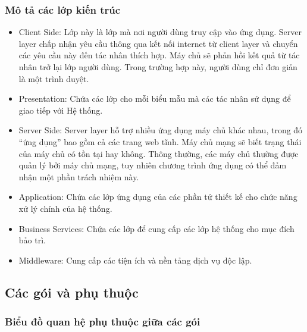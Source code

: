 \documentclass[./../main_file.tex]{subfiles}
\begin{document}
\subsubsection{Mô tả các lớp kiến trúc}

\begin{itemize}
	\item Client Side: Lớp này là lớp mà nơi người dùng truy cập vào ứng dụng. Server layer chấp nhận yêu cầu thông qua kết nối internet từ client layer và chuyển các yêu cầu này đến tác nhân thích hợp. Máy chủ sẽ phản hồi kết quả từ tác nhân trở lại lớp người dùng. Trong trường hợp này, người dùng chỉ đơn giản là một trình duyệt.
	\item Presentation: Chứa các lớp cho mỗi biểu mẫu mà các tác nhân sử dụng để giao tiếp với Hệ thống.
	\item Server Side: Server layer hỗ trợ nhiều ứng dụng máy chủ khác nhau, trong đó “ứng dụng” bao gồm cả các trang web tĩnh. Máy chủ mạng sẽ biết trạng thái của máy chủ có tồn tại hay không. Thông thường, các máy chủ thường được quản lý bởi máy chủ mạng, tuy nhiên chương trình ứng dụng có thể đảm nhận một phần trách nhiệm này.
	\item Application: Chứa các lớp ứng dụng của các phần tử thiết kế cho chức năng xử lý chính của hệ thống.
	\item Business Services: Chứa các lớp để cung cấp các lớp hệ thống cho mục đích bảo trì.
	\item Middleware: Cung cấp các tiện ích và nền tảng dịch vụ độc lập.
\end{itemize}

\subsection{Các gói và phụ thuộc}

\subsubsection{Biểu đồ quan hệ phụ thuộc giữa các gói}
\end{document}
